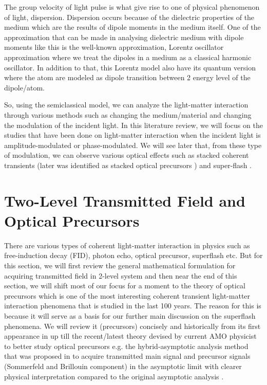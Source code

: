 The group velocity of light pulse is what give rise to one of physical phenomenon of light, dispersion. Dispersion occurs because of the dielectric properties of the medium which are the results of dipole moments in the medium itself. One of the approximation that can be made in analysing dielectric medium with dipole moments like this is the well-known approximation, Lorentz oscillator approximation where we treat the dipoles in a medium as a classical harmonic oscillator. In addition to that, this Lorentz model also have its quantum version where the atom are modeled as dipole transition between 2 energy level of the dipole/atom.

So, using the semiclassical model, we can analyze the light-matter interaction through various methods such as changing the medium/material and changing the modulation of the incident light. In this literature review, we will focus on the studies that have been done on light-matter interaction when the incident light is amplitude-modulated or phase-modulated. We will see later that, from these type of modulation, we can observe various optical effects such as stacked coherent transients \cite{Segard_1987} (later was identified as stacked optical precursors \cite{jeong2010slow}) and super-flash \cite{Kwong2014}.\\


\section{Two-Level Transmitted Field and Optical Precursors}
There are various types of coherent light-matter interaction in physics such as free-induction decay (FID), photon echo, optical precursor, superflash etc. But for this section, we will first review the general mathematical formulation for acquiring transmitted field in 2-level system and then near the end of this section, we will shift most of our focus for a moment to the theory of optical precursors which is one of the most interesting coherent transient light-matter interaction phenomena that is studied in the last 100 years. The reason for this is because it will serve as a basis for our further main discussion on the superflash phenomena. We will review it (precursors) concisely and historically from its first appearance in \cite{Sommerfeld1914, Brillouin1914} up till the recent/latest theory devised by current AMO physicist to better study optical precursors e.g. the hybrid-asymptotic analysis method that was proposed in \cite{Jeong2009} to acquire transmitted main signal and precursor signals (Sommerfeld and Brillouin component) in the asymptotic limit with clearer physical interpretation compared to the original asymptotic analysis \cite{Sherman1981}.

